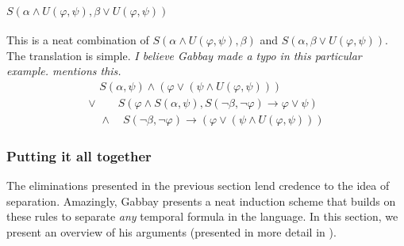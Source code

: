 \documentclass[a4paper,UKenglish,cleveref, autoref, thm-restate, numberwithinsect]{lipics-v2021}
\begin{document}
\paragraph*{$S(\alpha \land U(\varphi,\psi), \beta \lor U(\varphi, \psi))$}
This is a neat combination of $S(\alpha \land U(\varphi, \psi), \beta)$ and $S(\alpha, \beta \lor U(\varphi, \psi))$. The translation is simple. \textit{I believe Gabbay made a typo in this particular example. \cite{xpathComplete} mentions this.}
\begin{equation*}
    \begin{aligned}
        \quad S(\alpha, \psi) \land (\varphi \lor (\psi \land U(\varphi, \psi))) \\
        \lor \quad \quad S(\varphi \land S(\alpha, \psi), S(\lnot \beta, \lnot \varphi) \to \varphi \lor \psi)\\
        \quad \land \quad S(\lnot \beta, \lnot \varphi) \to (\varphi \lor (\psi \land U(\varphi, \psi)))
    \end{aligned}
\end{equation*}

\subsubsection{Putting it all together}

The eliminations presented in the previous section lend credence to the idea of separation. Amazingly, Gabbay presents a neat induction scheme that builds on these rules to separate \textit{any} temporal formula in the language. In this section, we present an overview of his arguments (presented in more detail in \cite{gabbay1994}).
\end{document}
